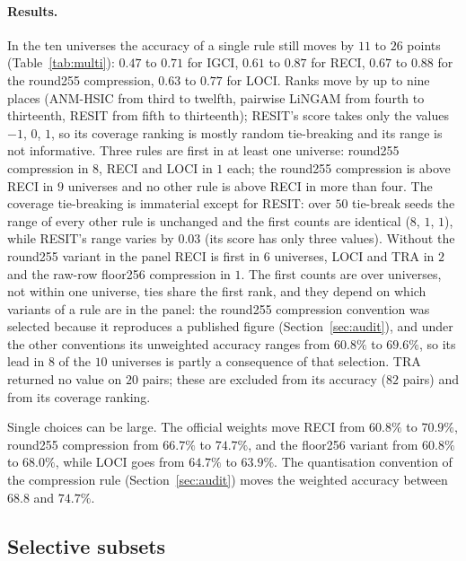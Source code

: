\paragraph{Results.} In the ten universes the accuracy of a single rule still moves by $11$ to $26$ points (Table~\ref{tab:multi}): $0.47$ to $0.71$ for IGCI, $0.61$ to $0.87$ for RECI, $0.67$ to $0.88$ for the round255 compression, $0.63$ to $0.77$ for LOCI. Ranks move by up to nine places (ANM-HSIC from third to twelfth, pairwise LiNGAM from fourth to thirteenth, RESIT from fifth to thirteenth); RESIT's score takes only the values $-1$, $0$, $1$, so its coverage ranking is mostly random tie-breaking and its range is not informative. Three rules are first in at least one universe: round255 compression in $8$, RECI and LOCI in $1$ each; the round255 compression is above RECI in $9$ universes and no other rule is above RECI in more than four. The coverage tie-breaking is immaterial except for RESIT: over $50$ tie-break seeds the range of every other rule is unchanged and the first counts are identical ($8$, $1$, $1$), while RESIT's range varies by $0.03$ (its score has only three values). Without the round255 variant in the panel RECI is first in $6$ universes, LOCI and TRA in $2$ and the raw-row floor256 compression in $1$. The first counts are over universes, not within one universe, ties share the first rank, and they depend on which variants of a rule are in the panel: the round255 compression convention was selected because it reproduces a published figure (Section~\ref{sec:audit}), and under the other conventions its unweighted accuracy ranges from $60.8\%$ to $69.6\%$, so its lead in $8$ of the $10$ universes is partly a consequence of that selection. TRA returned no value on $20$ pairs; these are excluded from its accuracy ($82$ pairs) and from its coverage ranking.

Single choices can be large. The official weights move RECI from $60.8\%$ to $70.9\%$, round255 compression from $66.7\%$ to $74.7\%$, and the floor256 variant from $60.8\%$ to $68.0\%$, while LOCI goes from $64.7\%$ to $63.9\%$. The quantisation convention of the compression rule (Section~\ref{sec:audit}) moves the weighted accuracy between $68.8$ and $74.7\%$.

\subsection{Selective subsets}\label{sec:subsets}

